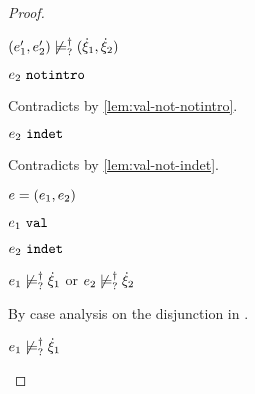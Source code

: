 \begin{proof}
\begin{byCases}
\begin{byCases}
\begin{byCases}
\begin{byCases}
\begin{byCases}
\begin{pfsteps*}
            \item $(e_1' , e_2') \not\models_{?}^{\dag} (\dot{\xi}_1 , \dot{\xi}_2)$ 
            \end{pfsteps*} 
            \item[\text{(\ref{rule:IVIndet})}]
            \begin{pfsteps*}
            \item $e_2 ~\mathtt{notintro}$ 
            \end{pfsteps*} 
            Contradicts  by \autoref{lem:val-not-notintro}.
            \item[\text{(\ref{rule:IVInl}), (\ref{rule:IVInr}), (\ref{rule:IVPair})}]
            \begin{pfsteps*}
            \item $e_2 ~\mathtt{indet}$ 
            \end{pfsteps*} 
            Contradicts  by \autoref{lem:val-not-indet}.
          \end{byCases}
        \end{byCases}
      \end{byCases}
      \item[\text{(\ref{rule:IPairR})}] 
      \begin{pfsteps*}
      \item $e=(e_1 , e_2)$ 
      \item $e_1 ~\mathtt{val}$  
      \item $e_2 ~\mathtt{indet}$  
      \item $e_1 \not\models_{?}^{\dag} \dot{\xi}_1$ or $e_2 \not\models_{?}^{\dag} \dot{\xi}_2$  
      \end{pfsteps*}
      By case analysis on the disjunction in .
      \begin{byCases}
        \item[\cnotsatisfyormay{e_1}{\hxi_1}]
        \begin{pfsteps*}
        \item $e_1 \not\models_{?}^{\dag} \dot{\xi}_1$  
        \end{pfsteps*}

\end{byCases}
\end{byCases}
\end{byCases}
\end{proof}

